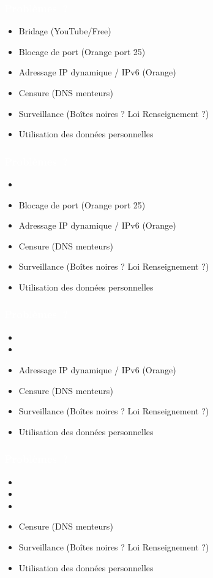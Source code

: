 \documentclass[notes=hide]{beamer}
\begin{document}
\begin{frame}
  \frametitle{\textcolor{white}{Problèmes~?}}
  \begin{itemize}
    \item Bridage (YouTube/Free)
    \item Blocage de port (Orange port 25)
    \item Adressage IP dynamique / IPv6 (Orange)
    \item Censure (DNS menteurs)
    \item Surveillance (Boîtes noires ? Loi Renseignement ?)
    \item Utilisation des données personnelles
  \end{itemize}
\end{frame}

\begin{frame}
  \frametitle{\textcolor{white}{Problèmes~?}}
  \begin{itemize}
    \item
    \item Blocage de port (Orange port 25)
    \item Adressage IP dynamique / IPv6 (Orange)
    \item Censure (DNS menteurs)
    \item Surveillance (Boîtes noires ? Loi Renseignement ?)
    \item Utilisation des données personnelles
  \end{itemize}
\end{frame}

\begin{frame}
  \frametitle{\textcolor{white}{Problèmes~?}}
  \begin{itemize}
    \item
    \item
    \item Adressage IP dynamique / IPv6 (Orange)
    \item Censure (DNS menteurs)
    \item Surveillance (Boîtes noires ? Loi Renseignement ?)
    \item Utilisation des données personnelles
  \end{itemize}
\end{frame}

\begin{frame}
  \frametitle{\textcolor{white}{Problèmes~?}}
  \begin{itemize}
    \item
    \item
    \item
    \item Censure (DNS menteurs)
    \item Surveillance (Boîtes noires ? Loi Renseignement ?)
    \item Utilisation des données personnelles
  \end{itemize}
\end{frame}
\end{document}
